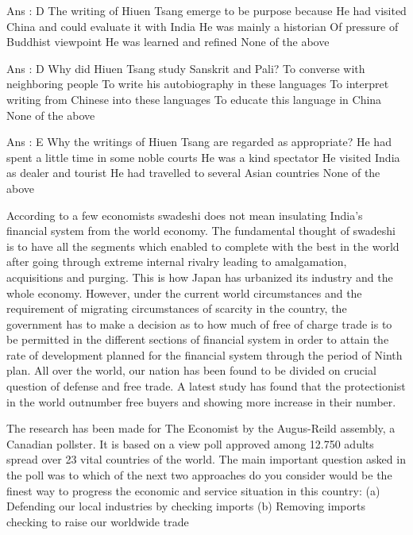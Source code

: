     Ans : D
    The writing of Hiuen Tsang emerge to be purpose because
        He had visited China and could evaluate it with India
        He was mainly a historian
        Of pressure of Buddhist viewpoint
        He was learned and refined
        None of the above 

    Ans : D
    Why did Hiuen Tsang study Sanskrit and Pali?
        To converse with neighboring people
        To write his autobiography in these languages
        To interpret writing from Chinese into these languages
        To educate this language in China
        None of the above 

    Ans : E
    Why the writings of Hiuen Tsang are regarded as appropriate?
        He had spent a little time in some noble courts
        He was a kind spectator
        He visited India as dealer and tourist
        He had travelled to several Asian countries
        None of the above 


According to a few economists swadeshi does not mean insulating India’s financial system from the world economy. The fundamental thought of swadeshi is to have all the segments which enabled to complete with the best in the world after going through extreme internal rivalry leading to amalgamation, acquisitions and purging. This is how Japan has urbanized its industry and the whole economy. However, under the current world circumstances and the requirement of migrating circumstances of scarcity in the country, the government has to make a decision as to how much of free of charge trade is to be permitted in the different sections of financial system in order to attain the rate of development planned for the financial system through the period of Ninth plan. All over the world, our nation has been found to be divided on crucial question of defense and free trade. A latest study has found that the protectionist in the world outnumber free buyers and showing more increase in their number.

The research has been made for The Economist by the Augus-Reild assembly, a Canadian pollster. It is based on a view poll approved among 12.750 adults spread over 23 vital countries of the world. The main important question asked in the poll was to which of the next two approaches do you consider would be the finest way to progress the economic and service situation in this country:
(a) Defending our local industries by checking imports
(b) Removing imports checking to raise our worldwide trade

